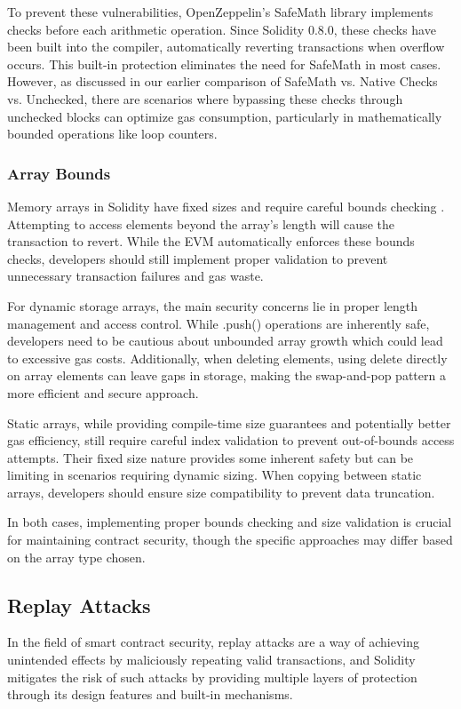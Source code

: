 \documentclass[conference]{IEEEtran}
\begin{document}
To prevent these vulnerabilities, OpenZeppelin's SafeMath library implements checks before each arithmetic operation. Since Solidity 0.8.0, these checks have been built into the compiler, automatically reverting transactions when overflow occurs. This built-in protection eliminates the need for SafeMath in most cases. However, as discussed in our earlier comparison of SafeMath vs. Native Checks vs. Unchecked, there are scenarios where bypassing these checks through unchecked blocks can optimize gas consumption, particularly in mathematically bounded operations like loop counters.

\subsubsection{Array Bounds}
Memory arrays in Solidity have fixed sizes and require careful bounds checking \cite{solidityStorage}. Attempting to access elements beyond the array's length will cause the transaction to revert. While the EVM automatically enforces these bounds checks, developers should still implement proper validation to prevent unnecessary transaction failures and gas waste.

For dynamic storage arrays, the main security concerns lie in proper length management and access control. While .push() operations are inherently safe, developers need to be cautious about unbounded array growth which could lead to excessive gas costs. Additionally, when deleting elements, using delete directly on array elements can leave gaps in storage, making the swap-and-pop pattern a more efficient and secure approach.

Static arrays, while providing compile-time size guarantees and potentially better gas efficiency, still require careful index validation to prevent out-of-bounds access attempts. Their fixed size nature provides some inherent safety but can be limiting in scenarios requiring dynamic sizing. When copying between static arrays, developers should ensure size compatibility to prevent data truncation.

In both cases, implementing proper bounds checking and size validation is crucial for maintaining contract security, though the specific approaches may differ based on the array type chosen.

\vspace{1em}
\subsection{Replay Attacks}
In the field of smart contract security, replay attacks are a way of achieving unintended effects by maliciously repeating valid transactions, and Solidity mitigates the risk of such attacks by providing multiple layers of protection through its design features and built-in mechanisms.
\end{document}
